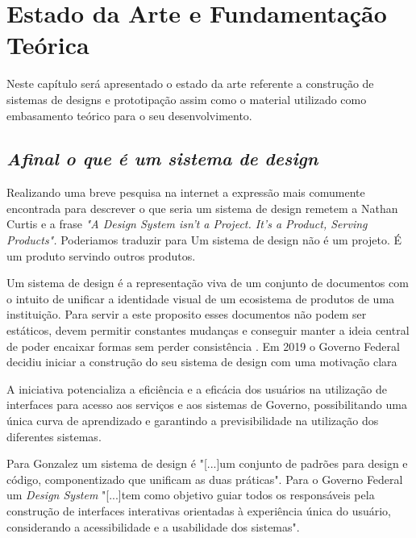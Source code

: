 \chapter[Capítulo 2]{Estado da Arte e Fundamentação Teórica}
\label{ch:cap2}

  Neste capítulo será apresentado o estado da arte referente a construção de sistemas de designs e prototipação assim como o material utilizado como embasamento teórico para o seu desenvolvimento.

\section[\textit{Seção}]{\textit{Afinal o que é um sistema de design}}
  Realizando uma breve pesquisa na internet a expressão mais comumente encontrada para descrever o que seria um sistema de design remetem a Nathan Curtis e a frase \textit{"A Design System isn’t a Project. It’s a Product, Serving Products".} \cite{descricao_sistema_design} Poderiamos traduzir para Um sistema de design não é um projeto. É um produto servindo outros produtos.

  Um sistema de design é a representação viva de um conjunto de documentos com o intuito de unificar a identidade visual de um ecosistema de produtos de uma instituição. Para servir a este proposito esses documentos não podem ser estáticos, devem permitir constantes mudanças e conseguir manter a ideia central de poder encaixar formas sem perder consistência \cite{design_gov_digital}.
  Em 2019 o Governo Federal decidiu iniciar a construção do seu sistema  de design com uma motivação clara

\begin{citacao}[brazil]
  [...]A iniciativa potencializa a eficiência e a eficácia dos usuários na utilização de interfaces para acesso aos serviços e aos sistemas de Governo, possibilitando uma única curva de aprendizado e garantindo a previsibilidade na utilização dos diferentes sistemas. \cite{design_gov_federal}
\end{citacao}

  Para Gonzalez um sistema de design é "[...]um conjunto de padrões para design e código, componentizado que unificam as duas práticas". \cite{GuilhermeGonzalez} Para o Governo Federal um \textit{Design System} "[...]tem como objetivo guiar todos os responsáveis pela construção de interfaces interativas orientadas à experiência única do usuário, considerando a acessibilidade e a usabilidade dos sistemas". \cite{design_gov_federal}

